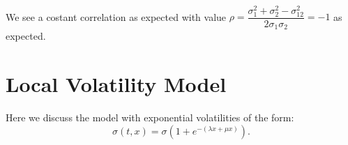 \documentclass[11pt]{article}
\begin{document}
    \begin{center}
    \end{center}
    { \hspace*{\fill} \\}
    
    We see a costant correlation as expected with value
\(\rho=\dfrac{\sigma_1^2 + \sigma_2^2 - \sigma_{12}^2}{2 \sigma_1 \sigma_2} = -1\)
as expected.

    \section{Local Volatility Model}\label{local-volatility-model}

Here we discuss the model with exponential volatilities of the form:
\[\sigma(t,x) = \sigma (1 + e^{-(\lambda x + \mu x)}).\]
\end{document}
